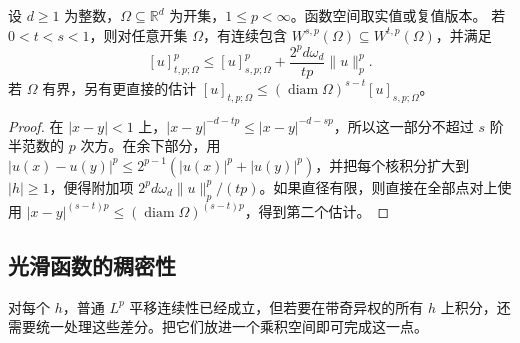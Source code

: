 \begin{proposition}\label{b1:prop:fractional-order-embedding}
设 \(d\geq1\) 为整数，\(\Omega\subseteq\mathbb R^d\) 为开集，\(1\leq p<\infty\)。函数空间取实值或复值版本。
若 \(0<t<s<1\)，则对任意开集 \(\Omega\)，有连续包含 \(W^{s,p}(\Omega)\subseteq W^{t,p}(\Omega)\)，并满足
\[
 [u]_{t,p;\Omega}^p
 \leq[u]_{s,p;\Omega}^p+\frac{2^pd\omega_d}{tp}\|u\|_p^p.
\]
若 \(\Omega\) 有界，另有更直接的估计
\( [u]_{t,p;\Omega}\leq(\operatorname{diam}\Omega)^{s-t}[u]_{s,p;\Omega}\)。
\end{proposition}
\begin{proof}
在 \(|x-y|<1\) 上，\(|x-y|^{-d-tp}\leq|x-y|^{-d-sp}\)，所以这一部分不超过 \(s\) 阶半范数的 \(p\) 次方。在余下部分，用
\( |u(x)-u(y)|^p\leq2^{p-1}(|u(x)|^p+|u(y)|^p)\)，并把每个核积分扩大到 \(|h|\geq1\)，便得附加项 \(2^pd\omega_d\|u\|_p^p/(tp)\)。如果直径有限，则直接在全部点对上使用 \(|x-y|^{(s-t)p}\leq(\operatorname{diam}\Omega)^{(s-t)p}\)，得到第二个估计。
\end{proof}

\subsection{光滑函数的稠密性}
\label{b1:subsec:230204}

对每个 \(h\)，普通 \(L^p\) 平移连续性已经成立，但若要在带奇异权的所有 \(h\) 上积分，还需要统一处理这些差分。把它们放进一个乘积空间即可完成这一点。


